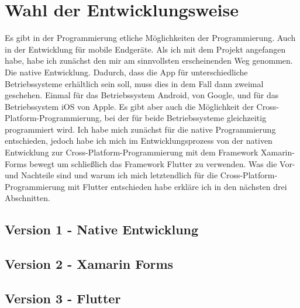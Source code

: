 \section{Wahl der Entwicklungsweise}
Es gibt in der Programmierung etliche Möglichkeiten der Programmierung. Auch in der Entwicklung für mobile Endgeräte.
Als ich mit dem Projekt angefangen habe, habe ich zunächst den mir am sinnvollsten erscheinenden Weg genommen. Die native Entwicklung.
Dadurch, dass die App für unterschiedliche Betriebssysteme erhältlich sein soll, muss dies in dem Fall dann zweimal geschehen.
Einmal für das Betriebssystem Android\cite{Android}, von Google, und für das Betriebssystem iOS\cite{iOS} von Apple.
Es gibt aber auch die Möglichkeit der Cross-Platform-Programmierung, bei der für beide Betriebssysteme gleichzeitig programmiert wird.
Ich habe mich zunächst für die native Programmierung entschieden, jedoch habe ich mich im Entwicklungsprozess von der nativen Entwicklung zur
Cross-Platform-Programmierung mit dem Framework Xamarin-Forms bewegt um schließlich das Framework Flutter zu verwenden.
Was die Vor- und Nachteile sind und warum ich mich letztendlich für die Cross-Platform-Programmierung mit Flutter entschieden habe
erkläre ich in den nächsten drei Abschnitten.

    \subsection{Version 1 - Native Entwicklung}
    \subsection{Version 2 - Xamarin Forms}
    \subsection{Version 3 - Flutter}

